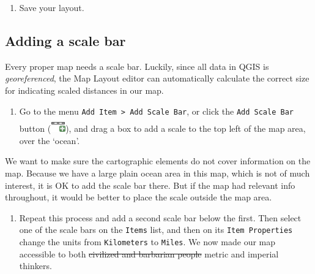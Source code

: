 \documentclass[
  letterpaper,
  DIV=11,
  numbers=noendperiod]{scrreprt}
\providecommand{\tightlist}{%
  \setlength{\itemsep}{0pt}\setlength{\parskip}{0pt}}\usepackage{longtable,booktabs,array}
\begin{document}
\begin{enumerate}
\def\labelenumi{(\arabic{enumi})}
\setcounter{enumi}{249}
\tightlist
\item
  Save your layout.
\end{enumerate}

\subsection{Adding a scale bar}\label{adding-a-scale-bar}

Every proper map needs a scale bar. Luckily, since all data in QGIS is
\emph{georeferenced}, the Map Layout editor can automatically calculate
the correct size for indicating scaled distances in our map.

\begin{enumerate}
\def\labelenumi{(\arabic{enumi})}
\setcounter{enumi}{250}
\tightlist
\item
  Go to the menu \texttt{Add\ Item\ \textgreater{}\ Add\ Scale\ Bar}, or
  click the \texttt{Add\ Scale\ Bar} button
  (\includegraphics{index_files/mediabag/mActionScaleBar.png}), and drag
  a box to add a scale to the top left of the map area, over the
  `ocean'.
\end{enumerate}

\begin{tcolorbox}[enhanced jigsaw, coltitle=black, toprule=.15mm, breakable, opacitybacktitle=0.6, left=2mm, colback=white, leftrule=.75mm, rightrule=.15mm, colbacktitle=quarto-callout-tip-color!10!white, toptitle=1mm, titlerule=0mm, colframe=quarto-callout-tip-color-frame, arc=.35mm, bottomtitle=1mm, opacityback=0, bottomrule=.15mm, title=\textcolor{quarto-callout-tip-color}{\faLightbulb}\hspace{0.5em}{Tip}]

We want to make sure the cartographic elements do not cover information
on the map. Because we have a large plain ocean area in this map, which
is not of much interest, it is OK to add the scale bar there. But if the
map had relevant info throughout, it would be better to place the scale
outside the map area.

\end{tcolorbox}

\begin{enumerate}
\def\labelenumi{(\arabic{enumi})}
\setcounter{enumi}{251}
\tightlist
\item
  Repeat this process and add a second scale bar below the first. Then
  select one of the scale bars on the \texttt{Items} list, and then on
  its \texttt{Item\ Properties} change the units from
  \texttt{Kilometers} to \texttt{Miles}. We now made our map accessible
  to both \st{civilized and barbarian people} metric and imperial
  thinkers.
\end{enumerate}
\end{document}
